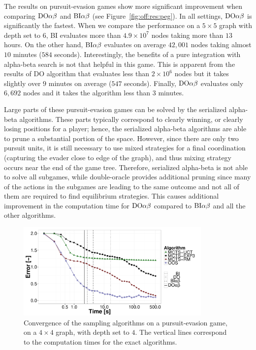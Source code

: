 The results on pursuit-evasion games show more significant improvement when comparing $\textrm{DO}\alpha\beta$ and $\textrm{BI}\alpha\beta$ (see Figure~\ref{fig:off:res:peg}). In all settings, $\textrm{DO}\alpha\beta$ is significantly the fastest. When we compare the performance on a $5\times5$ graph with depth set to $6$, \textsc{BI} evaluates more than $4.9\times10^7$ nodes taking more than $13$ hours. On the other hand, $\textrm{BI}\alpha\beta$ evaluates on average $42,001$ nodes taking almost $10$ minutes ($584$ seconds). Interestingly, the benefits of a pure integration with alpha-beta search is not that helpful in this game.
This is apparent from the results of \textsc{DO} algorithm that evaluates less than $2\times10^6$ nodes but it takes slightly over $9$ minutes on average ($547$ seconds). Finally, $\textrm{DO}\alpha\beta$ evaluates only $6,692$ nodes and it takes the algorithm less than $3$ minutes.

Large parts of these pursuit-evasion games can be solved by the serialized alpha-beta algorithms.
These parts typically correspond to clearly winning, or clearly losing positions for a player; hence, the serialized alpha-beta algorithms are able to prune a substantial portion of the space.
However, since there are only two pursuit units, it is still necessary to use mixed strategies for a final coordination (capturing the evader close to edge of the graph), and thus mixing strategy occurs near the end of the game tree.
Therefore, serialized alpha-beta is not able to solve all subgames, while double-oracle provides additional pruning since many of the actions in the subgames are leading to the same outcome and not all of them are required to find equilibrium strategies.
This causes additional improvement in the computation time for $\textrm{DO}\alpha\beta$ compared to $\textrm{BI}\alpha\beta$ and all the other algorithms.%

\begin{figure}[t!]
\centering
\includegraphics[width=0.85\textwidth]{figures/convergence-peg.pdf}
\caption{Convergence of the sampling algorithms on a pursuit-evasion game, on a $4\times4$ graph, with depth set to $4$. The vertical lines correspond to the computation times for the exact algorithms.} \label{fig:off:conv:peg}
\end{figure}

